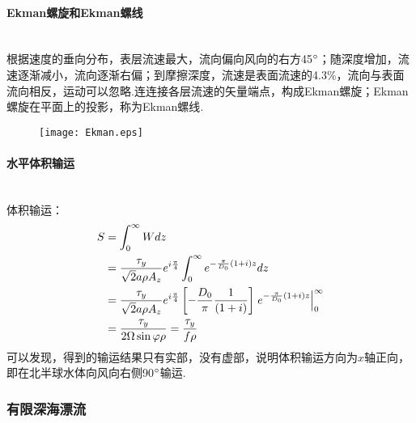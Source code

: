 \documentclass[a4paper,12pt]{article}
\begin{document}
	\paragraph{Ekman螺旋和Ekman螺线}~{}\\
	根据速度的垂向分布，表层流速最大，流向偏向风向的右方45$\degree$；随深度增加，流速逐渐减小，流向逐渐右偏；到摩擦深度，流速是表面流速的4.3\%，流向与表面流向相反，运动可以忽略.连连接各层流速的矢量端点，构成Ekman螺旋；Ekman螺旋在平面上的投影，称为Ekman螺线\cite{Ekman}.
	\begin{figure}[H]
		\centering\texttt{[image: Ekman.eps]}
		\caption*{} 
	\end{figure}
	\paragraph{水平体积输运}~{}\\
	体积输运：
	\[
	\begin{aligned}
	S &= \int_0^\infty  W dz \\
	&= {{{\tau _y}} \over {\sqrt 2 a\rho {A_z}}}{e^{i{\pi  \over 4}}}\int_0^\infty  {{e^{ - {\pi  \over {{D_0}}}(1 + i)z}}} dz\\
	&= {{{\tau _y}} \over {\sqrt 2 a\rho {A_z}}}{e^{i{\pi  \over 4}}}\left[ { - {{{D_0}} \over \pi }{1 \over {(1 + i)}}} \right]\left. {{e^{ - {\pi  \over {{D_0}}}(1 + i)z}}} \right|_0^\infty\\
	&= {{{\tau _y}} \over {2\Omega \sin \varphi \rho }} = {{{\tau _y}} \over {f\rho }}
	\end{aligned}
	\]
	\indent
    可以发现，得到的输运结果只有实部，没有虚部，说明体积输运方向为$x$轴正向，即在北半球水体向风向右侧90$\degree$输运.
    \subsubsection{有限深海漂流}
\end{document}
